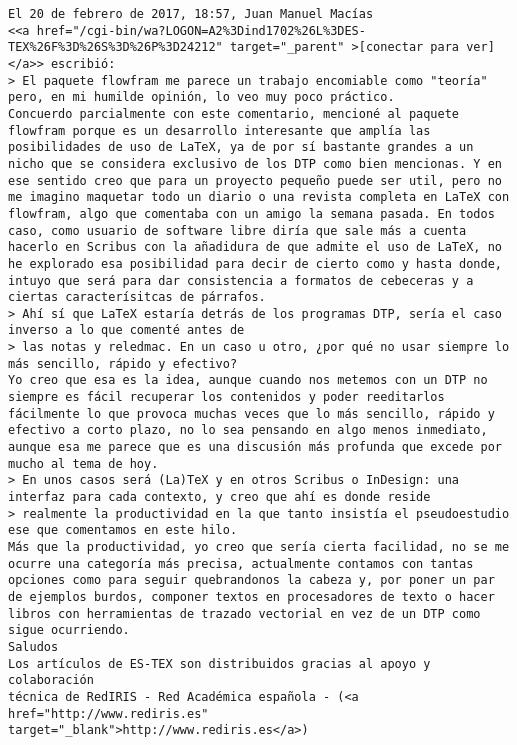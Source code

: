 \documentclass[a4paper,10pt]{article}
\begin{document}
\begin{lstlisting}
El 20 de febrero de 2017, 18:57, Juan Manuel Macías
<<a href="/cgi-bin/wa?LOGON=A2%3Dind1702%26L%3DES-TEX%26F%3D%26S%3D%26P%3D24212" target="_parent" >[conectar para ver]</a>> escribió:
> El paquete flowfram me parece un trabajo encomiable como "teoría" pero, en mi humilde opinión, lo veo muy poco práctico.
Concuerdo parcialmente con este comentario, mencioné al paquete
flowfram porque es un desarrollo interesante que amplía las
posibilidades de uso de LaTeX, ya de por sí bastante grandes a un
nicho que se considera exclusivo de los DTP como bien mencionas. Y en
ese sentido creo que para un proyecto pequeño puede ser util, pero no
me imagino maquetar todo un diario o una revista completa en LaTeX con
flowfram, algo que comentaba con un amigo la semana pasada. En todos
caso, como usuario de software libre diría que sale más a cuenta
hacerlo en Scribus con la añadidura de que admite el uso de LaTeX, no
he explorado esa posibilidad para decir de cierto como y hasta donde,
intuyo que será para dar consistencia a formatos de cebeceras y a
ciertas caracterísitcas de párrafos.
> Ahí sí que LaTeX estaría detrás de los programas DTP, sería el caso inverso a lo que comenté antes de
> las notas y reledmac. En un caso u otro, ¿por qué no usar siempre lo más sencillo, rápido y efectivo?
Yo creo que esa es la idea, aunque cuando nos metemos con un DTP no
siempre es fácil recuperar los contenidos y poder reeditarlos
fácilmente lo que provoca muchas veces que lo más sencillo, rápido y
efectivo a corto plazo, no lo sea pensando en algo menos inmediato,
aunque esa me parece que es una discusión más profunda que excede por
mucho al tema de hoy.
> En unos casos será (La)TeX y en otros Scribus o InDesign: una interfaz para cada contexto, y creo que ahí es donde reside
> realmente la productividad en la que tanto insistía el pseudoestudio ese que comentamos en este hilo.
Más que la productividad, yo creo que sería cierta facilidad, no se me
ocurre una categoría más precisa, actualmente contamos con tantas
opciones como para seguir quebrandonos la cabeza y, por poner un par
de ejemplos burdos, componer textos en procesadores de texto o hacer
libros con herramientas de trazado vectorial en vez de un DTP como
sigue ocurriendo.
Saludos
Los artículos de ES-TEX son distribuidos gracias al apoyo y colaboración 
técnica de RedIRIS - Red Académica española - (<a href="http://www.rediris.es" target="_blank">http://www.rediris.es</a>)

\end{lstlisting}
\end{document}
